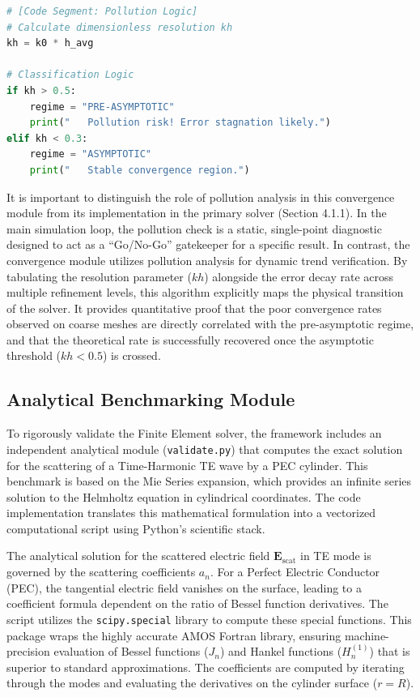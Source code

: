 \documentclass[class=report, crop=false]{standalone}
\begin{document}
\begin{lstlisting}[language=Python, caption={Pollution Detection Logic}]
# [Code Segment: Pollution Logic]
# Calculate dimensionless resolution kh
kh = k0 * h_avg

# Classification Logic
if kh > 0.5:
    regime = "PRE-ASYMPTOTIC"
    print("   Pollution risk! Error stagnation likely.")
elif kh < 0.3:
    regime = "ASYMPTOTIC"
    print("   Stable convergence region.")
\end{lstlisting}

It is important to distinguish the role of pollution analysis in this convergence module from its implementation in the primary solver (Section 4.1.1). In the main simulation loop, the pollution check is a static, single-point diagnostic designed to act as a ``Go/No-Go'' gatekeeper for a specific result. In contrast, the convergence module utilizes pollution analysis for dynamic trend verification. By tabulating the resolution parameter ($kh$) alongside the error decay rate across multiple refinement levels, this algorithm explicitly maps the physical transition of the solver. It provides quantitative proof that the poor convergence rates observed on coarse meshes are directly correlated with the pre-asymptotic regime, and that the theoretical rate is successfully recovered once the asymptotic threshold ($kh < 0.5$) is crossed.

\subsection{Analytical Benchmarking Module}

To rigorously validate the Finite Element solver, the framework includes an independent analytical module (\texttt{validate.py}) that computes the exact solution for the scattering of a Time-Harmonic TE wave by a PEC cylinder. This benchmark is based on the Mie Series expansion, which provides an infinite series solution to the Helmholtz equation in cylindrical coordinates. The code implementation translates this mathematical formulation into a vectorized computational script using Python's scientific stack.

The analytical solution for the scattered electric field $\bm{E}_{\text{scat}}$ in TE mode is governed by the scattering coefficients $a_n$. For a Perfect Electric Conductor (PEC), the tangential electric field vanishes on the surface, leading to a coefficient formula dependent on the ratio of Bessel function derivatives. The script utilizes the \texttt{scipy.special} library to compute these special functions. This package wraps the highly accurate AMOS Fortran library, ensuring machine-precision evaluation of Bessel functions ($J_n$) and Hankel functions ($H_n^{(1)}$) that is superior to standard approximations. The coefficients are computed by iterating through the modes and evaluating the derivatives on the cylinder surface ($r=R$).
\end{document}
